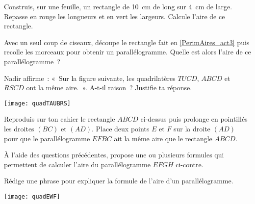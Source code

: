 
\begin{activite}

\begin{partie} \label{PerimAires_act3}
Construis, sur une feuille, un rectangle de 10 cm de long sur 4 cm de large. Repasse en rouge les longueurs et en vert les largeurs. Calcule l'aire de ce rectangle.
\end{partie}

\begin{partie}
Avec un seul coup de ciseaux, découpe le rectangle fait en \ref{PerimAires_act3} puis recolle les morceaux pour obtenir un parallélogramme. Quelle est alors l’aire de ce parallélogramme ?
\end{partie}

\begin{partie}
Nadir affirme : « Sur la figure suivante, les quadrilatères $TUCD$, $ABCD$ et $RSCD$ ont la même aire. ». A-t-il raison ? Justifie ta réponse.\\[0.5em]
\begin{center} \texttt{[image: quadTAUBRS]} \end{center}
\end{partie}

\begin{partie}
Reproduis sur ton cahier le rectangle $ABCD$ ci-dessus puis prolonge en pointillés les droites $(BC)$ et $(AD)$. Place deux points $E$ et $F$ sur la droite $(AD)$ pour que le parallélogramme $EFBC$ ait la même aire que le rectangle $ABCD$.
\end{partie}

\begin{minipage}[c]{0.64\linewidth}
\begin{partie}
À l'aide des questions précédentes, propose une ou plusieurs formules qui permettent de calculer l'aire du parallélogramme $EFGH$ ci-contre.
\end{partie}

\begin{partie}
Rédige une phrase pour expliquer la formule de l'aire d'un parallélogramme.
\end{partie}
 \end{minipage} \hfill%
 \begin{minipage}[c]{0.34\linewidth}
  \texttt{[image: quadEWF]}
  \end{minipage} \\

\end{activite}

